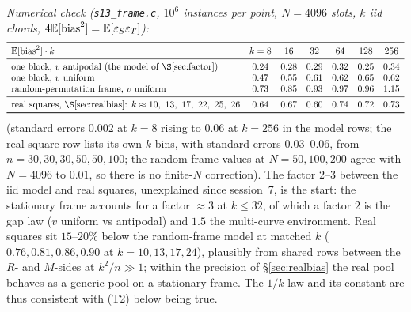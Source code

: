 \emph{Numerical check (\texttt{s13\_frame.c}, $10^6$ instances per
point, $N=4096$ slots, $k$ iid chords, $4\mathbb{E}[\mathrm{bias}^2]=\mathbb{E}[\varepsilon_S\varepsilon_T]$):}
\[
\begin{array}{lcccccc}
\toprule
\E[\mathrm{bias}^2]\cdot k & k=8 & 16 & 32 & 64 & 128 & 256\\
\midrule
\text{one block, $v$ antipodal (the model of \S\ref{sec:factor})} & 0.24 & 0.28 & 0.29 & 0.32 & 0.25 & 0.34\\
\text{one block, $v$ uniform} & 0.47 & 0.55 & 0.61 & 0.62 & 0.65 & 0.62\\
\text{random-permutation frame, $v$ uniform} & 0.73 & 0.85 & 0.93 & 0.97 & 0.96 & 1.15\\
\midrule
\text{real squares, \S\ref{sec:realbias}: } k\approx10,\ 13,\ 17,\ 22,\ 25,\ 26 & 0.64 & 0.67 & 0.60 & 0.74 & 0.72 & 0.73\\
\bottomrule
\end{array}
\]
(standard errors $0.002$ at $k=8$ rising to $0.06$ at $k=256$ in
the model rows; the real-square row lists its own $k$-bins, with
standard errors $0.03$--$0.06$, from $n=30,30,30,50,50,100$; the
random-frame values at $N=50,100,200$ agree with $N=4096$ to
$0.01$, so there is no finite-$N$ correction).  The factor $2$--$3$
between the iid model and real squares, unexplained since
session~7, is the start: the stationary frame accounts for a factor
$\approx3$ at $k\le32$, of which a factor $2$ is the gap law ($v$
uniform vs antipodal) and $1.5$ the multi-curve environment.  Real
squares sit $15$--$20\%$ below the random-frame model at matched
$k$ ($0.76,0.81,0.86,0.90$ at $k=10,13,17,24$), plausibly from
shared rows between the $R$- and $M$-sides at $k^2/n\gg1$; within
the precision of \S\ref{sec:realbias} the real pool behaves as a
generic pool on a stationary frame.  The $1/k$ law and its constant are thus consistent
with (T2) below being true.

